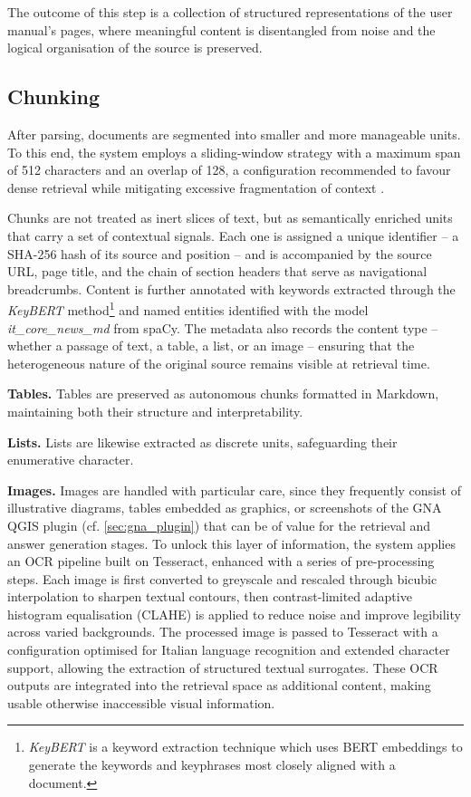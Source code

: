 \begin{spacing}{1.5}
The outcome of this step is a collection of structured representations of the user manual’s pages, where meaningful content is disentangled from noise and the logical organisation of the source is preserved.


\subsection{Chunking}
After parsing, documents are segmented into smaller and more manageable units. To this end, the system employs a sliding-window strategy with a maximum span of 512 characters and an overlap of 128, a configuration recommended to favour dense retrieval while mitigating excessive fragmentation of context \citep{wang_searching_2024}.

Chunks are not treated as inert slices of text, but as semantically enriched units that carry a set of contextual signals. Each one is assigned a unique identifier -- a SHA-256 hash of its source and position -- and is accompanied by the source URL, page title, and the chain of section headers that serve as navigational breadcrumbs. Content is further annotated with keywords extracted through the \textit{KeyBERT} method\footnote{\textit{KeyBERT} is a keyword extraction technique which uses BERT embeddings to generate the keywords and keyphrases most closely aligned with a document.} and named entities identified with the model \textit{it\_core\_news\_md} from spaCy. The metadata also records the content type -- whether a passage of text, a table, a list, or an image -- ensuring that the heterogeneous nature of the original source remains visible at retrieval time.

\textbf{Tables. }Tables are preserved as autonomous chunks formatted in Markdown, maintaining both their structure and interpretability. 

\textbf{Lists. }Lists are likewise extracted as discrete units, safeguarding their enumerative character. 

\textbf{Images. }Images are handled with particular care, since they frequently consist of illustrative diagrams, tables embedded as graphics, or screenshots of the GNA QGIS plugin (cf. \autoref{sec:gna_plugin}) that can be of value for the retrieval and answer generation stages. To unlock this layer of information, the system applies an OCR pipeline built on Tesseract, enhanced with a series of pre-processing steps. Each image is first converted to greyscale and rescaled through bicubic interpolation to sharpen textual contours, then contrast-limited adaptive histogram equalisation (CLAHE) is applied to reduce noise and improve legibility across varied backgrounds. The processed image is passed to Tesseract with a configuration optimised for Italian language recognition and extended character support, allowing the extraction of structured textual surrogates. These OCR outputs are integrated into the retrieval space as additional content, making usable otherwise inaccessible visual information.


\end{spacing}

